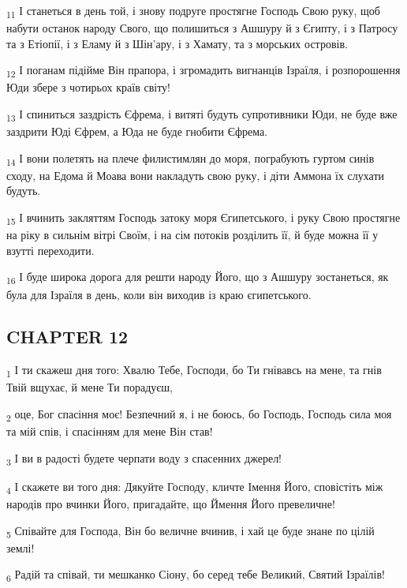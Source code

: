 \begin{tcolorbox}
\textsubscript{11} І станеться в день той, і знову подруге простягне Господь Свою руку, щоб набути останок народу Свого, що полишиться з Ашшуру й з Єгипту, і з Патросу та з Етіопії, і з Еламу й з Шін'ару, і з Хамату, та з морських островів.
\end{tcolorbox}
\begin{tcolorbox}
\textsubscript{12} І поганам підійме Він прапора, і згромадить вигнанців Ізраїля, і розпорошення Юди збере з чотирьох країв світу!
\end{tcolorbox}
\begin{tcolorbox}
\textsubscript{13} І спиниться заздрість Єфрема, і витяті будуть супротивники Юди, не буде вже заздрити Юді Єфрем, а Юда не буде гнобити Єфрема.
\end{tcolorbox}
\begin{tcolorbox}
\textsubscript{14} І вони полетять на плече филистимлян до моря, пограбують гуртом синів сходу, на Едома й Моава вони накладуть свою руку, і діти Аммона їх слухати будуть.
\end{tcolorbox}
\begin{tcolorbox}
\textsubscript{15} І вчинить закляттям Господь затоку моря Єгипетського, і руку Свою простягне на ріку в сильнім вітрі Своїм, і на сім потоків розділить її, й буде можна її у взутті переходити.
\end{tcolorbox}
\begin{tcolorbox}
\textsubscript{16} І буде широка дорога для решти народу Його, що з Ашшуру зостанеться, як була для Ізраїля в день, коли він виходив із краю єгипетського.
\end{tcolorbox}
\subsection{CHAPTER 12}
\begin{tcolorbox}
\textsubscript{1} І ти скажеш дня того: Хвалю Тебе, Господи, бо Ти гнівавсь на мене, та гнів Твій вщухає, й мене Ти порадуєш,
\end{tcolorbox}
\begin{tcolorbox}
\textsubscript{2} оце, Бог спасіння моє! Безпечний я, і не боюсь, бо Господь, Господь сила моя та мій спів, і спасінням для мене Він став!
\end{tcolorbox}
\begin{tcolorbox}
\textsubscript{3} І ви в радості будете черпати воду з спасенних джерел!
\end{tcolorbox}
\begin{tcolorbox}
\textsubscript{4} І скажете ви того дня: Дякуйте Господу, кличте Імення Його, сповістіть між народів про вчинки Його, пригадайте, що Ймення Його превеличне!
\end{tcolorbox}
\begin{tcolorbox}
\textsubscript{5} Співайте для Господа, Він бо величне вчинив, і хай це буде знане по цілій землі!
\end{tcolorbox}
\begin{tcolorbox}
\textsubscript{6} Радій та співай, ти мешканко Сіону, бо серед тебе Великий, Святий Ізраїлів!
\end{tcolorbox}
